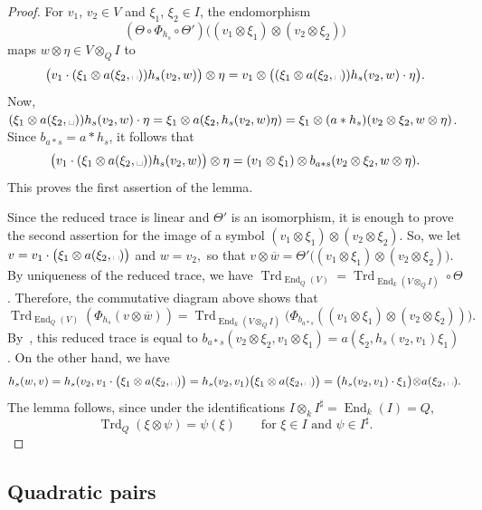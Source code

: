 \documentclass{amsart}
\DeclareMathOperator{\End}{End}
\DeclareMathOperator{\Trd}{Trd}
\theoremstyle{remark}
\begin{document}
  \begin{proof}
  For $v_1$, $v_2\in V$ and $\xi_1$, $\xi_2\in I$, the endomorphism 
  \[(\Theta\circ\Phi_{h_s}\circ
  \Theta')\bigl((v_1\otimes\xi_1)\otimes(v_2\otimes\xi_2)\bigr)\] maps
  $w\otimes\eta\in V\otimes_QI$ to
  \[
    \bigl(v_1\cdot(\xi_1\otimes
    a(\xi_2,\mbox{\textvisiblespace}))h_s(v_2,w)\bigr) \otimes\eta =
    v_1\otimes\bigl((\xi_1\otimes a(\xi_2,\mbox{\textvisiblespace}))
    h_s(v_2,w)\cdot\eta\bigr).
  \]
  Now, $(\xi_1\otimes a(\xi_2,\mbox{\textvisiblespace}))
    h_s(v_2,w)\cdot\eta=\xi_1\otimes a(\xi_2,h_s(v_2,w)\eta) =
    \xi_1\otimes 
    (a*h_s)(v_2\otimes\xi_2,w\otimes\eta)$. Since $b_{a*s} = a*h_s$,
    it follows that
    \[
      \bigl(v_1\cdot(\xi_1\otimes
      a(\xi_2,\mbox{\textvisiblespace}))h_s(v_2,w)\bigr) \otimes\eta =
      (v_1\otimes\xi_1)\otimes b_{a*s}(v_2\otimes\xi_2,w\otimes\eta).\]
      This proves the first assertion of the lemma. 
     
         Since the reduced trace is linear and $\Theta'$ is an isomorphism, it is enough to prove the second assertion for the image of a symbol $(v_1\otimes \xi_1)\otimes (v_2\otimes \xi_2)$. So, 
        we let 
  $v=v_1\cdot\bigl(\xi_1\otimes
    a(\xi_2,\mbox{\textvisiblespace})\bigr)$ and $w=v_2,$ so that $v\otimes\overline w=\Theta'\bigl((v_1\otimes \xi_1)\otimes(v_2\otimes \xi_2)\bigr).$ By uniqueness of the reduced trace, we have $\Trd_{\End_Q(V)}=\Trd_{\End_k(V\otimes_QI)}\circ \Theta$. Therefore, the commutative diagram above shows that 
    \[\Trd_{\End_Q(V)}(\Phi_{h_s}(v\otimes \overline w))=\Trd_{\End_k(V\otimes_Q I)}\bigl(\Phi_{b_{a*s}}((v_1\otimes\xi_1)\otimes (v_2\otimes \xi_2))\bigr).\] 
By~\cite[(5.1)]{BoI}, this reduced trace is equal to $b_{a*s}(v_2\otimes \xi_2,v_1\otimes \xi_1)=a(\xi_2,h_s(v_2,v_1)\xi_1)$. 
On the other hand, we have 
\[h_s(w,v)=h_s(v_2,v_1\cdot \bigl(\xi_1\otimes
    a(\xi_2,\mbox{\textvisiblespace})\bigr)=h_s(v_2,v_1)\bigl(\xi_1\otimes
    a(\xi_2,\mbox{\textvisiblespace})\bigr)=\bigl(h_s(v_2,v_1)\cdot\xi_1\bigl)\otimes
    a(\xi_2,\mbox{\textvisiblespace}).
\]
The lemma follows, since under the identifications $I\otimes_kI^\sharp
=\End_k(I)=Q$,
\begin{equation}
  \label{eq:Trdsplit}
  \Trd_Q(\xi\otimes\psi) = \psi(\xi) \qquad\text{for $\xi\in I$ and
    $\psi\in I^\sharp$.}
\end{equation}
\qedhere
\end{proof}

\subsection{Quadratic pairs}
\label{subsec:quadpair}
\end{document}
